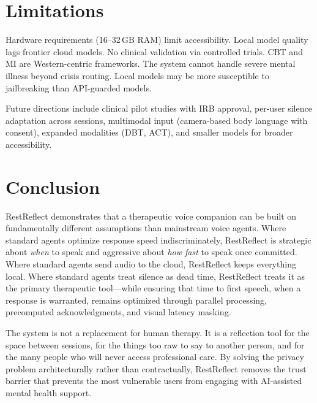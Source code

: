 \documentclass{article}
\begin{document}
\section{Limitations}

Hardware requirements (16--32\,GB RAM) limit accessibility. Local model quality lags frontier cloud models. No clinical validation via controlled trials. CBT and MI are Western-centric frameworks. The system cannot handle severe mental illness beyond crisis routing. Local models may be more susceptible to jailbreaking than API-guarded models.

Future directions include clinical pilot studies with IRB approval, per-user silence adaptation across sessions, multimodal input (camera-based body language with consent), expanded modalities (DBT, ACT), and smaller models for broader accessibility.

\section{Conclusion}

RestReflect demonstrates that a therapeutic voice companion can be built on fundamentally different assumptions than mainstream voice agents. Where standard agents optimize response speed indiscriminately, RestReflect is strategic about \emph{when} to speak and aggressive about \emph{how fast} to speak once committed. Where standard agents send audio to the cloud, RestReflect keeps everything local. Where standard agents treat silence as dead time, RestReflect treats it as the primary therapeutic tool---while ensuring that time to first speech, when a response is warranted, remains optimized through parallel processing, precomputed acknowledgments, and visual latency masking.

The system is not a replacement for human therapy. It is a reflection tool for the space between sessions, for the things too raw to say to another person, and for the many people who will never access professional care. By solving the privacy problem architecturally rather than contractually, RestReflect removes the trust barrier that prevents the most vulnerable users from engaging with AI-assisted mental health support.



\end{document}
